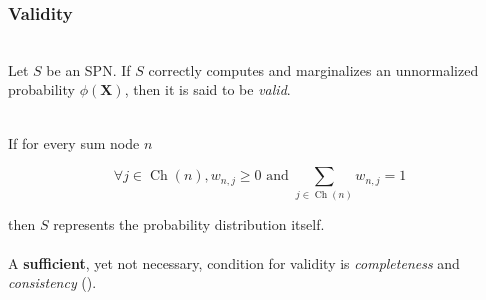 \documentclass{beamer}
\DeclareMathOperator*{\Ch}{\text{Ch}}
\newcommand{\mbf}[1]{\mathbf{#1}}
\begin{document}
\begin{frame}
  \frametitle{Validity}

  \begin{definition}[Validity]~\\
    Let $S$ be an SPN. If $S$ correctly computes and marginalizes an unnormalized probability
    $\phi(\mbf{X})$, then it is said to be \emph{valid}.
  \end{definition}~\\

  If for every sum node $n$

  \begin{equation*}
    \forall j\in\Ch(n), w_{n,j} \geq 0\text{ and }\sum_{j\in\Ch(n)}w_{n,j} = 1
  \end{equation*}

  then $S$ represents the probability distribution itself.\\~\\

  A \textbf{sufficient}, yet not necessary, condition for validity is \emph{completeness} and
  \emph{consistency} (\cite{poon-domingos}).

\end{frame}
\end{document}
